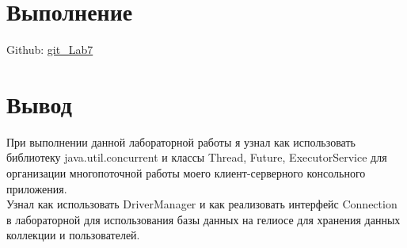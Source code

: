 \documentclass[a4paper,12pt]{article}
\begin{document}
	
	\section*{Выполнение}
	Github: \href{https://github.com/VeselFe/Lab_N7.git}{git\_Lab7}
	
	\section*{Вывод}
	При выполнении данной лабораторной работы я узнал как использовать библиотеку java.util.concurrent и классы Thread, Future, ExecutorService для организации многопоточной работы моего клиент-серверного консольного приложения. \\
	Узнал как использовать DriverManager и как реализовать интерфейс Connection в лабораторной для использования базы данных на гелиосе для хранения данных коллекции и пользователей.
	
	
	
\end{document}
